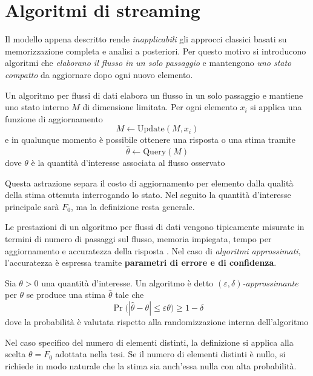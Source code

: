 \section{Algoritmi di streaming}
Il modello appena descritto rende \textit{inapplicabili} gli approcci classici basati su memorizzazione completa
e analisi a posteriori. Per questo motivo si introducono algoritmi che \textit{elaborano il flusso in un solo passaggio}
e mantengono \textit{uno stato compatto} da aggiornare dopo ogni nuovo elemento.

\begin{definition}
Un algoritmo per flussi di dati elabora un flusso in un solo passaggio e mantiene uno stato interno $M$
di dimensione limitata. Per ogni elemento $x_i$ si applica una funzione di aggiornamento
\[
M \leftarrow \mathrm{Update}(M, x_i)
\]
e in qualunque momento è possibile ottenere una risposta o una stima tramite
\[
\hat{\theta} \leftarrow \mathrm{Query}(M)
\]
dove $\theta$ è la quantità d'interesse associata al flusso osservato
\cite{Muthukrishnan_2005}
\end{definition}

Questa astrazione separa il costo di aggiornamento per elemento dalla qualità della stima ottenuta interrogando lo stato.
Nel seguito la quantità d'interesse principale sarà $F_0$, ma la definizione resta generale.

Le prestazioni di un algoritmo per flussi di dati vengono tipicamente misurate in termini di numero di passaggi sul flusso,
memoria impiegata, tempo per aggiornamento e accuratezza della risposta \cite{Prezza_2025}.
Nel caso di \textit{algoritmi approssimati}, l'accuratezza è espressa tramite \textbf{parametri di errore e di confidenza}.

\begin{definition}
Sia $\theta > 0$ una quantità d'interesse. Un algoritmo è detto \emph{$(\varepsilon,\delta)$-approssimante}
per $\theta$ se produce una stima $\hat{\theta}$ tale che
\[
\Pr\bigl(|\hat{\theta} - \theta| \le \varepsilon \theta\bigr) \ge 1 - \delta
\]
dove la probabilità è valutata rispetto alla randomizzazione interna dell'algoritmo
\cite{BarYossef_Jayram_Kumar_Sivakumar_Trevisan_2002}
\end{definition}

Nel caso specifico del numero di elementi distinti, la definizione si applica alla scelta $\theta = F_0$ adottata nella tesi.
Se il numero di elementi distinti è nullo, si richiede in modo naturale che la stima sia anch'essa nulla con alta probabilità.

